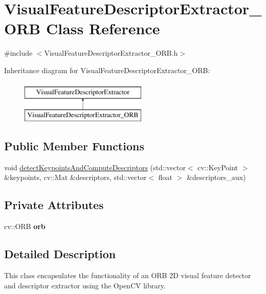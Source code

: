 \hypertarget{class_visual_feature_descriptor_extractor___o_r_b}{
\section{VisualFeatureDescriptorExtractor\_\-ORB Class Reference}
\label{class_visual_feature_descriptor_extractor___o_r_b}
}


{\ttfamily \#include $<$VisualFeatureDescriptorExtractor\_\-ORB.h$>$}

Inheritance diagram for VisualFeatureDescriptorExtractor\_\-ORB:\begin{figure}[H]
\begin{center}
\leavevmode
\includegraphics[height=2.000000cm]{class_visual_feature_descriptor_extractor___o_r_b}
\end{center}
\end{figure}
\subsection*{Public Member Functions}
\begin{DoxyCompactItemize}
\item 
void \hyperlink{class_visual_feature_descriptor_extractor___o_r_b_a2cded6e20e202bb6f2db3a64edeaffcf}{detectKeypointsAndComputeDescriptors} (std::vector$<$ cv::KeyPoint $>$ \&keypoints, cv::Mat \&descriptors, std::vector$<$ float $>$ \&descriptors\_\-aux)
\end{DoxyCompactItemize}
\subsection*{Private Attributes}
\begin{DoxyCompactItemize}
\item 
\hypertarget{class_visual_feature_descriptor_extractor___o_r_b_a07083d7edf26ab7fe0a12e270650517f}{
cv::ORB {\bfseries orb}}
\label{class_visual_feature_descriptor_extractor___o_r_b_a07083d7edf26ab7fe0a12e270650517f}

\end{DoxyCompactItemize}


\subsection{Detailed Description}
This class encapsulates the functionality of an ORB 2D visual feature detector and descriptor extractor using the OpenCV library. 

